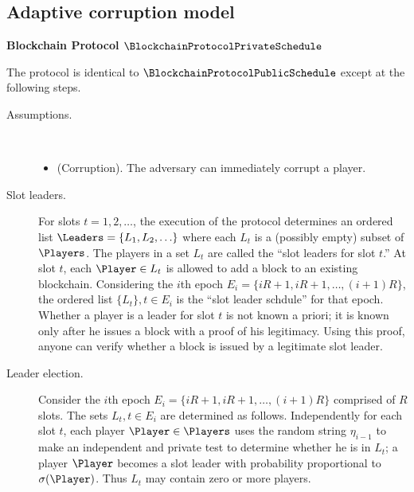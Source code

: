 \subsection{Adaptive corruption model}
\begin{minipage}[c]{\textwidth}
	\begin{center}
		\textbf{Blockchain Protocol $\BlockchainProtocolPrivateSchedule$}
	\end{center}
	\begin{framed}
		The protocol is identical to $\BlockchainProtocolPublicSchedule$ except at the following steps.

		\begin{description}

			\item[Assumptions.]~
			\begin{itemize}[labelindent=0cm]
				\item (Corruption). The adversary can immediately corrupt a player. 
			\end{itemize}

			\item[Slot leaders.]
			For slots $t = 1, 2, \ldots$, the execution of the protocol 
			determines an ordered list $\Leaders = \{L_1, L_2, \ldots\}$ 
			where each $L_t$ is a (possibly empty) subset of $\Players$. 
			The players in a set $L_t$ are called the ``slot leaders for slot $t$.''
			At slot $t$, each $\Player \in L_t$ is allowed to add a block to an existing blockchain. 
			Considering the $i$th epoch $E_i = \{iR + 1, iR + 1, \ldots, (i+1)R\}$, 
			the ordered list $\{L_t\}, t \in E_i$ is the ``slot leader schdule'' for that epoch.
			Whether a player is a leader for slot $t$ is not known a priori; 
			it is known only after he issues a block with a proof of his legitimacy.
			Using this proof, anyone can verify whether a block is issued by a legitimate slot leader.


			\item[Leader election.]
			Consider the $i$th epoch $E_i = \{iR + 1, iR + 1, \ldots, (i+1)R\}$ comprised of $R$ slots.
			The sets $L_t, t \in E_i$ are determined as follows.
			Independently for each slot $t$, each player $\Player \in \Players$ 
			uses the random string $\eta_{i-1}$ to make 
			an independent and private test to determine whether he is 
			in $L_t$; 
			a player $\Player$ becomes a slot leader
			with probability proportional to $\sigma(\Player)$. 
			Thus $L_t$ may contain zero or more players. 

		\end{description}

	\end{framed}
\end{minipage}
